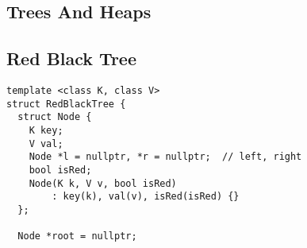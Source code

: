 \documentclass[twoside]{article}
\newcommand{\fileTitleStyle}{\large\underline}
\begin{document}
\begin{multicols*}{2}
\sectionfont{\centering\bfseries\Huge}
\vspace{1em}
\section*{Trees And Heaps}
\vspace{3em}
\subsectionfont{\centering\bfseries\LARGE}
\subsectionfont{\fileTitleStyle}
\subsection*{Red Black Tree}
\begin{verbatim}
template <class K, class V>
struct RedBlackTree {
  struct Node {
    K key;
    V val;
    Node *l = nullptr, *r = nullptr;  // left, right
    bool isRed;
    Node(K k, V v, bool isRed)
        : key(k), val(v), isRed(isRed) {}
  };

  Node *root = nullptr;
  

\end{verbatim}
\end{multicols*}
\end{document}
